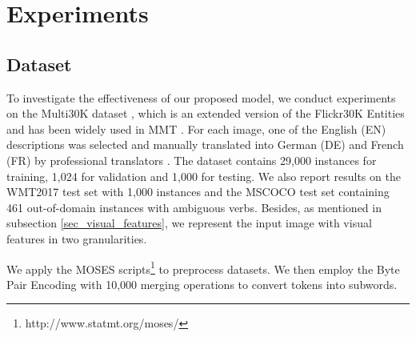 \documentclass[sigconf]{acmart}
\begin{document}
\iffalse
As mentioned previously, we exploit two capsule networks for visual features in different granularities. Thus, we can obtain two multimodal context vectors $\mathbf{\overline{m}}_{g}$ and $\mathbf{C}_m^{r}$, which can be further fused via the following gating mechanism: 

\begin{align}
&\mathbf{C}_m = \mathbf{\alpha}\cdot\mathbf{C}_m^{g} + (1-\mathbf{\alpha})\cdot\mathbf{C}_m^{r} \\
&\mathbf{\alpha} = \text{Sigmoid}(\mathbf{W}_g\cdot\mathbf{C}_m^{g}+\mathbf{W}_r\cdot\mathbf{C}_m^{r}),
\end{align}
where $\mathbf{W}^{g}$ and $\mathbf{W}_r$ are learnable parameters. 
Afterwards, $\mathbf{C}_m$ will be exploited by our decoder for better translation prediction (\textbf{Eq.} \ref{equ_ffn}).
\fi





\section{Experiments}
\subsection{Dataset}
To investigate the effectiveness of our proposed model, we  conduct experiments on the Multi30K dataset \cite{elliott2016multi30k}, 
which is an extended version of the Flickr30K Entities and has been widely used in MMT \cite{mmt18,mmt17,mmt16}.
For each image, one of the English (EN) descriptions was selected and manually translated into German (DE) and French (FR) by professional translators \cite{mmt16}. The dataset
contains 29,000 instances for training, 1,024 for validation and 1,000 for testing. 
We also report results on the WMT2017 test set with 1,000 instances and the MSCOCO test set containing 461 out-of-domain instances with ambiguous verbs.
Besides, as mentioned in subsection \ref{sec_visual_features}, we represent the input image with visual features in two granularities.

We apply the MOSES scripts\footnote{http://www.statmt.org/moses/} to preprocess datasets.  We then employ the Byte Pair Encoding \cite{sennrich2015neural} with 10,000 merging operations to convert tokens into subwords.
\end{document}
